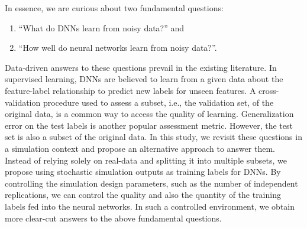 In essence, we are curious about two fundamental questions:
\begin{enumerate}
    \item ``What do DNNs learn from noisy data?'' and 
    \item ``How well do neural networks learn from noisy data?''.
\end{enumerate}
Data-driven answers to these questions prevail in the existing literature.
In supervised learning, DNNs are believed to learn from a given data about the feature-label relationship to predict new labels for unseen features.
A cross-validation procedure used to assess a subset, i.e., the validation set, of the original data, is a common way to access the quality of learning.
Generalization error on the test labels is another popular assessment metric.
However, the test set is also a subset of the original data.
In this study, we revisit these questions in a simulation context and propose an alternative approach to answer them.
Instead of relying solely on real-data and splitting it into multiple subsets, we propose using stochastic simulation outputs as training labels for DNNs.
By controlling the simulation design parameters, such as the number of independent replications, we can control the quality and also the quantity of the training labels fed into the neural networks.
In such a controlled environment, we obtain more clear-cut answers to the above fundamental questions.

